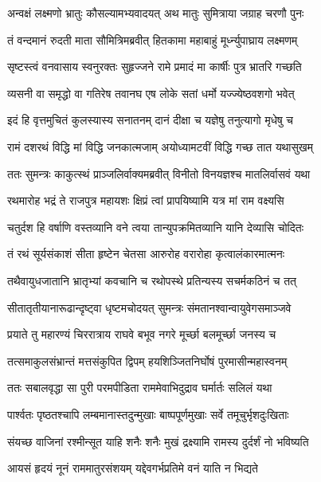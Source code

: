 \twolineshloka
{अन्वक्षं लक्ष्मणो भ्रातुः कौसल्यामभ्यवादयत्}
{अथ मातुः सुमित्राया जग्राह चरणौ पुनः} %

\twolineshloka
{तं वन्दमानं रुदती माता सौमित्रिमब्रवीत्}
{हितकामा महाबाहुं मूर्ध्न्युपाघ्राय लक्ष्मणम्} %

\twolineshloka
{सृष्टस्त्वं वनवासाय स्वनुरक्तः सुहृज्जने}
{रामे प्रमादं मा कार्षीः पुत्र भ्रातरि गच्छति} %

\twolineshloka
{व्यसनी वा समृद्धो वा गतिरेष तवानघ}
{एष लोके सतां धर्मो यज्ज्येष्ठवशगो भवेत्} %

\twolineshloka
{इदं हि वृत्तमुचितं कुलस्यास्य सनातनम्}
{दानं दीक्षा च यज्ञेषु तनुत्यागो मृधेषु च} %

\twolineshloka
{रामं दशरथं विद्धि मां विद्धि जनकात्मजाम्}
{अयोध्यामटवीं विद्धि गच्छ तात यथासुखम्} %

\twolineshloka
{ततः सुमन्त्रः काकुत्स्थं प्राञ्जलिर्वाक्यमब्रवीत्}
{विनीतो विनयज्ञश्च मातलिर्वासवं यथा} %

\twolineshloka
{रथमारोह भद्रं ते राजपुत्र महायशः}
{क्षिप्रं त्वां प्रापयिष्यामि यत्र मां राम वक्ष्यसि} %

\twolineshloka
{चतुर्दश हि वर्षाणि वस्तव्यानि वने त्वया}
{तान्युपक्रमितव्यानि यानि देव्यासि चोदितः} %

\twolineshloka
{तं रथं सूर्यसंकाशं सीता हृष्टेन चेतसा}
{आरुरोह वरारोहा कृत्वालंकारमात्मनः} %

\twolineshloka
{तथैवायुधजातानि भ्रातृभ्यां कवचानि च}
{रथोपस्थे प्रतिन्यस्य सचर्मकठिनं च तत्} %

\twolineshloka
{सीतातृतीयानारूढान्दृष्ट्वा धृष्टमचोदयत्}
{सुमन्त्रः संमतानश्वान्वायुवेगसमाञ्जवे} %

\twolineshloka
{प्रयाते तु महारण्यं चिररात्राय राघवे}
{बभूव नगरे मूर्च्छा बलमूर्च्छा जनस्य च} %

\twolineshloka
{तत्समाकुलसंभ्रान्तं मत्तसंकुपित द्विपम्}
{हयशिञ्जितनिर्घोषं पुरमासीन्महास्वनम्} %

\twolineshloka
{ततः सबालवृद्धा सा पुरी परमपीडिता}
{राममेवाभिदुद्राव घर्मार्तः सलिलं यथा} %

\twolineshloka
{पार्श्वतः पृष्ठतश्चापि लम्बमानास्तदुन्मुखाः}
{बाष्पपूर्णमुखाः सर्वे तमूचुर्भृशदुःखिताः} %

\twolineshloka
{संयच्छ वाजिनां रश्मीन्सूत याहि शनैः शनैः}
{मुखं द्रक्ष्यामि रामस्य दुर्दर्शं नो भविष्यति} %

\twolineshloka
{आयसं हृदयं नूनं राममातुरसंशयम्}
{यद्देवगर्भप्रतिमे वनं याति न भिद्यते} %

